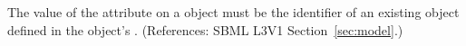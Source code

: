 The value of the attribute  on a \Model object must
be the identifier of an existing \Parameter object defined in the \Model
object's \ListOfSpecies.  (References: SBML L3V1
Section~\ref{sec:model}.)
